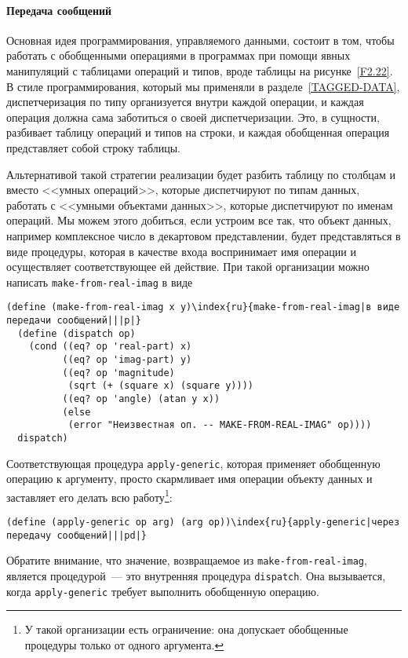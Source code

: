 \paragraph{Передача сообщений}


Основная идея программирования, управляемого данными,
состоит в том, чтобы работать с обобщенными операциями в программах
при помощи явных манипуляций с таблицами операций и типов, вроде
таблицы на рисунке~\ref{F2.22}.  В стиле программирования,
который мы применяли в разделе~\ref{TAGGED-DATA},
диспетчеризация по типу организуется внутри каждой операции, и каждая операция
должна сама заботиться о своей диспетчеризации.  Это, в сущности,
разбивает таблицу операций и типов на строки, и каждая
обобщенная операция представляет собой строку таблицы.

Альтернативой такой стратегии реализации будет разбить
таблицу по столбцам и вместо <<умных операций>>, которые диспетчируют по
типам данных, работать с <<умными объектами данных>>, которые
диспетчируют по именам операций.  Мы можем этого добиться, если
устроим все так, что объект данных, например комплексное число в
декартовом представлении, будет представляться в виде процедуры, которая в
качестве входа воспринимает имя операции и осуществляет
соответствующее ей действие.  При такой организации можно написать
{\tt make-from-real-imag} в виде

\begin{Verbatim}[fontsize=\small]
(define (make-from-real-imag x y)\index{ru}{make-from-real-imag|в виде передачи сообщений|||p|}
  (define (dispatch op)
    (cond ((eq? op 'real-part) x)
          ((eq? op 'imag-part) y)
          ((eq? op 'magnitude)
           (sqrt (+ (square x) (square y))))
          ((eq? op 'angle) (atan y x))
          (else
           (error "Неизвестная оп. -- MAKE-FROM-REAL-IMAG" op))))
  dispatch) 
\end{Verbatim}
Соответствующая процедура {\tt apply-generic}, которая
применяет обобщенную операцию к аргументу, просто скармливает имя
операции объекту данных и заставляет его делать всю работу\footnote{У такой организации есть ограничение: она допускает 
обобщенные процедуры только от одного аргумента.
}:

\begin{Verbatim}[fontsize=\small]
(define (apply-generic op arg) (arg op))\index{ru}{apply-generic|через передачу сообщений|||pd|}
\end{Verbatim}
Обратите внимание, что значение, возвращаемое из
{\tt make-from-real-imag}, является процедурой~--- это внутренняя
процедура {\tt dispatch}.  Она вызывается, когда
{\tt apply-generic} требует выполнить обобщенную операцию.


